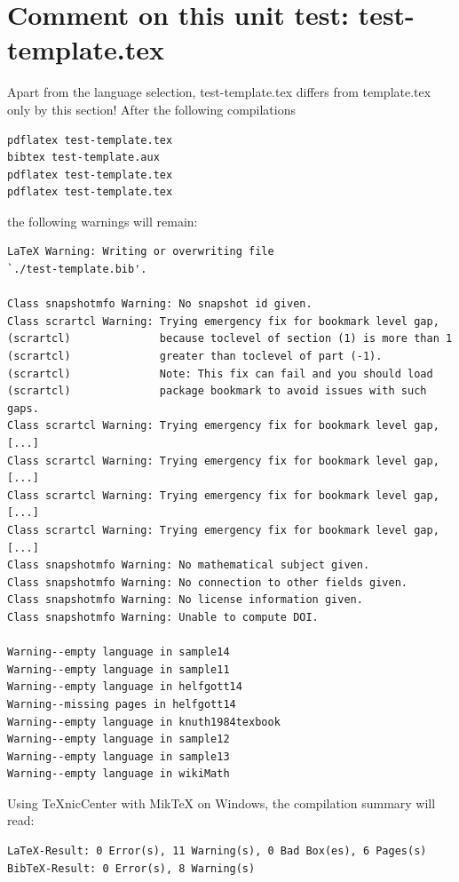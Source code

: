 \documentclass{snapshotmfo}
\begin{document}
\section{Comment on this unit test: test-template.tex}
Apart from the language selection, test-template.tex differs from template.tex only by this section!
After the following compilations
\begin{small}
\begin{verbatim}
pdflatex test-template.tex
bibtex test-template.aux
pdflatex test-template.tex
pdflatex test-template.tex
\end{verbatim}
\end{small}
the following warnings will remain:
\begin{small}
\begin{verbatim}
LaTeX Warning: Writing or overwriting file
`./test-template.bib'.

Class snapshotmfo Warning: No snapshot id given.
Class scrartcl Warning: Trying emergency fix for bookmark level gap,
(scrartcl)              because toclevel of section (1) is more than 1
(scrartcl)              greater than toclevel of part (-1).
(scrartcl)              Note: This fix can fail and you should load
(scrartcl)              package bookmark to avoid issues with such gaps.
Class scrartcl Warning: Trying emergency fix for bookmark level gap,
[...]
Class scrartcl Warning: Trying emergency fix for bookmark level gap,
[...]
Class scrartcl Warning: Trying emergency fix for bookmark level gap,
[...]
Class scrartcl Warning: Trying emergency fix for bookmark level gap,
[...]
Class snapshotmfo Warning: No mathematical subject given.
Class snapshotmfo Warning: No connection to other fields given.
Class snapshotmfo Warning: No license information given.
Class snapshotmfo Warning: Unable to compute DOI.

Warning--empty language in sample14
Warning--empty language in sample11
Warning--empty language in helfgott14
Warning--missing pages in helfgott14
Warning--empty language in knuth1984texbook
Warning--empty language in sample12
Warning--empty language in sample13
Warning--empty language in wikiMath
\end{verbatim}
\end{small}

Using TeXnicCenter with MikTeX on Windows, the compilation summary will read:
\begin{small}
\begin{verbatim}
LaTeX-Result: 0 Error(s), 11 Warning(s), 0 Bad Box(es), 6 Pages(s)
BibTeX-Result: 0 Error(s), 8 Warning(s)
\end{verbatim}
\end{small}
\end{document}
